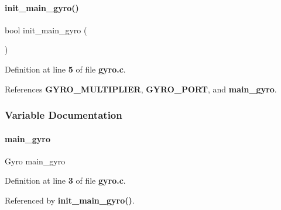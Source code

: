 \paragraph{init\+\_\+main\+\_\+gyro()}
{\footnotesize\ttfamily bool init\+\_\+main\+\_\+gyro (\begin{DoxyParamCaption}{ }\end{DoxyParamCaption})}



Definition at line \textbf{ 5} of file \textbf{ gyro.\+c}.



References \textbf{ G\+Y\+R\+O\+\_\+\+M\+U\+L\+T\+I\+P\+L\+I\+ER}, \textbf{ G\+Y\+R\+O\+\_\+\+P\+O\+RT}, and \textbf{ main\+\_\+gyro}.



\subsubsection{Variable Documentation}
\mbox{\label{gyro_8c_ab848a00cddfc20556aef426cf11f9a85}} 
\paragraph{main\+\_\+gyro}
{\footnotesize\ttfamily Gyro main\+\_\+gyro\hspace{0.3cm}{\ttfamily [static]}}



Definition at line \textbf{ 3} of file \textbf{ gyro.\+c}.



Referenced by \textbf{ init\+\_\+main\+\_\+gyro()}.


